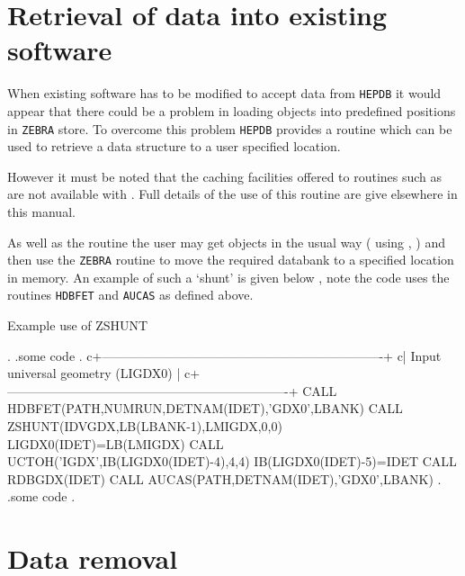 \section{Retrieval of data into existing software}
When existing software has to be modified to accept data from {\tt HEPDB}
it would appear that there could be a problem in loading objects into predefined
positions in {\tt ZEBRA} store. To overcome this problem {\tt HEPDB} provides a
routine  which can be used to retrieve a data structure to a user
specified location.
\par
However it must be noted that the caching facilities offered to routines such
as  are not available with . Full details of the use
of this routine are give elsewhere in this manual.
\par
As well as the routine  the user may get objects in the usual way
( using , ) and then use the {\tt ZEBRA} routine
 to move the required databank to a specified location in memory.
An example of such a `shunt' is given below , note the code uses the routines
{\tt HDBFET} and {\tt AUCAS} as defined above.
%
\begin{XMPt}{Example use of ZSHUNT}

               .
               .some code
               .
c+-------------------------------------------------------------------+
c|    Input universal geometry (LIGDX0)                              |
c+-------------------------------------------------------------------+
         CALL HDBFET(PATH,NUMRUN,DETNAM(IDET),'GDX0',LBANK)
         CALL ZSHUNT(IDVGDX,LB(LBANK-1),LMIGDX,0,0)
         LIGDX0(IDET)=LB(LMIGDX)
         CALL UCTOH('IGDX',IB(LIGDX0(IDET)-4),4,4)
         IB(LIGDX0(IDET)-5)=IDET
         CALL RDBGDX(IDET)
         CALL AUCAS(PATH,DETNAM(IDET),'GDX0',LBANK)
               .
               .some code
               .

\end{XMPt}
%
%
%
\section{Data removal}
